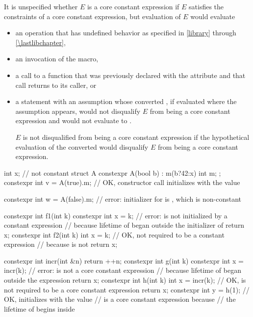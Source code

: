 \pnum
It is unspecified whether $E$ is a core constant expression
if $E$ satisfies the constraints of a core constant expression, but
evaluation of $E$ would evaluate
\begin{itemize}
\item
an operation that has undefined behavior
as specified in \ref{library} through \ref{\lastlibchapter},
\item
an invocation of the  macro,
\item
a call to a function
that was previously declared
with the  attribute and
that call returns to its caller, or
\item
a statement with an assumption
whose converted ,
if evaluated where the assumption appears,
would not disqualify $E$ from being a core constant expression and
would not evaluate to .
\begin{note}
$E$ is not disqualified from being a core constant expression
if the hypothetical evaluation of
the converted 
would disqualify $E$ from being a core constant expression.
\end{note}
\end{itemize}
\begin{example}
\begin{codeblock}
int x;                              // not constant
struct A {
  constexpr A(bool b) : m(b?42:x) { }
  int m;
};
constexpr int v = A(true).m;        // OK, constructor call initializes  with the value 

constexpr int w = A(false).m;       // error: initializer for  is , which is non-constant

constexpr int f1(int k) {
  constexpr int x = k;              // error:  is not initialized by a constant expression
                                    // because lifetime of  began outside the initializer of 
  return x;
}
constexpr int f2(int k) {
  int x = k;                        // OK, not required to be a constant expression
                                    // because  is not 
  return x;
}

constexpr int incr(int &n) {
  return ++n;
}
constexpr int g(int k) {
  constexpr int x = incr(k);        // error:  is not a core constant expression
                                    // because lifetime of  began outside the expression 
  return x;
}
constexpr int h(int k) {
  int x = incr(k);                  // OK,  is not required to be a core constant expression
  return x;
}
constexpr int y = h(1);             // OK, initializes  with the value 
                                    //  is a core constant expression because
                                    // the lifetime of  begins inside 
\end{codeblock}
\end{example}

